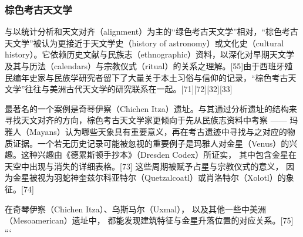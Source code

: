 \subsubsection{棕色考古天文学}
与以统计分析和天文对齐（alignment）为主的“绿色考古天文学”相对，“棕色考古天文学”被认为更接近于天文学史（history of astronomy）或文化史（cultural history）。它依赖历史文献与民族志（ethnographic）资料，以深化对早期天文学及其与历法（calendars）与宗教仪式（ritual）的关系之理解。[55]由于西班牙殖民编年史家与民族学研究者留下了大量关于本土习俗与信仰的记录，“棕色考古天文学”往往与美洲古代天文学的研究联系在一起。[71][72][32][33]  

最著名的一个案例是奇琴伊察（Chichen Itza）遗址。与其通过分析遗址的结构来寻找天文对齐的方向，棕色考古天文学家更倾向于先从民族志资料中考察 —— 玛雅人（Mayans）认为哪些天象具有重要意义，再在考古遗迹中寻找与之对应的物质证据。一个若无历史记录可能被忽视的重要例子是玛雅人对金星（Venus）的兴趣。这种兴趣由《德累斯顿手抄本》（Dresden Codex）所证实，  
其中包含金星在天空中出现与消失的详细表格。[73]  
这些周期被赋予占星与宗教仪式的意义，  
因为金星被视为羽蛇神奎兹尔科亚特尔（Quetzalcoatl）或肖洛特尔（Xolotl）的象征。[74]  

在奇琴伊察（Chichen Itza）、乌斯马尔（Uxmal），  
以及其他一些中美洲（Mesoamerican）遗址中，  
都能发现建筑特征与金星升落位置的对应关系。[75]
```


